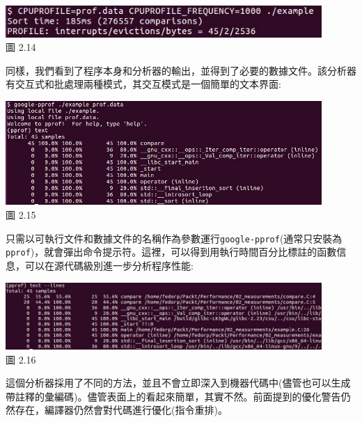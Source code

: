 \begin{center}
\includegraphics[width=0.9\textwidth]{content/1/chapter2/images/14.jpg}\\
圖 2.14
\end{center}

同樣，我們看到了程序本身和分析器的輸出，並得到了必要的數據文件。該分析器有交互式和批處理兩種模式，其交互模式是一個簡單的文本界面:

\begin{center}
\includegraphics[width=0.9\textwidth]{content/1/chapter2/images/15.jpg}\\
圖 2.15
\end{center}

只需以可執行文件和數據文件的名稱作為參數運行\texttt{google-pprof}(通常只安裝為\texttt{pprof})，就會彈出命令提示符。這裡，可以得到用執行時間百分比標註的函數信息，可以在源代碼級別進一步分析程序性能:

\begin{center}
\includegraphics[width=0.9\textwidth]{content/1/chapter2/images/16.jpg}\\
圖 2.16
\end{center}

這個分析器採用了不同的方法，並且不會立即深入到機器代碼中(儘管也可以生成帶註釋的彙編碼)。儘管表面上的看起來簡單，其實不然。前面提到的優化警告仍然存在，編譯器仍然會對代碼進行優化(指令重排)。

